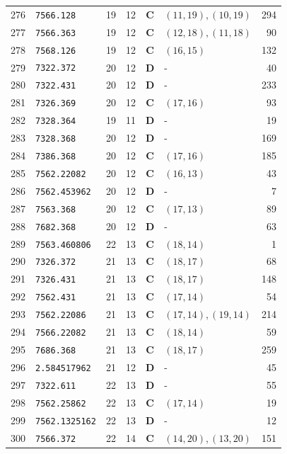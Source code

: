 \documentclass[11pt,a4paper]{article}
\begin{document}
\begin{small}
\begin{longtable}{r l c c c l r}
276 & \texttt{7566.128} & 19 & 12 & \textbf{C} & $(11,19), (10,19)$ & 294 \\
277 & \texttt{7566.363} & 19 & 12 & \textbf{C} & $(12,18), (11,18)$ & 90 \\
278 & \texttt{7568.126} & 19 & 12 & \textbf{C} & $(16,15)$ & 132 \\
279 & \texttt{7322.372} & 20 & 12 & \textbf{D} & - & 40 \\
280 & \texttt{7322.431} & 20 & 12 & \textbf{D} & - & 233 \\
281 & \texttt{7326.369} & 20 & 12 & \textbf{C} & $(17,16)$ & 93 \\
282 & \texttt{7328.364} & 19 & 11 & \textbf{D} & - & 19 \\
283 & \texttt{7328.368} & 20 & 12 & \textbf{D} & - & 169 \\
284 & \texttt{7386.368} & 20 & 12 & \textbf{C} & $(17,16)$ & 185 \\
285 & \texttt{7562.22082} & 20 & 12 & \textbf{C} & $(16,13)$ & 43 \\
286 & \texttt{7562.453962} & 20 & 12 & \textbf{D} & - & 7 \\
287 & \texttt{7563.368} & 20 & 12 & \textbf{C} & $(17,13)$ & 89 \\
288 & \texttt{7682.368} & 20 & 12 & \textbf{D} & - & 63 \\
289 & \texttt{7563.460806} & 22 & 13 & \textbf{C} & $(18,14)$ & 1 \\
290 & \texttt{7326.372} & 21 & 13 & \textbf{C} & $(18,17)$ & 68 \\
291 & \texttt{7326.431} & 21 & 13 & \textbf{C} & $(18,17)$ & 148 \\
292 & \texttt{7562.431} & 21 & 13 & \textbf{C} & $(17,14)$ & 54 \\
293 & \texttt{7562.22086} & 21 & 13 & \textbf{C} & $(17,14), (19,14)$ & 214 \\
294 & \texttt{7566.22082} & 21 & 13 & \textbf{C} & $(18,14)$ & 59 \\
295 & \texttt{7686.368} & 21 & 13 & \textbf{C} & $(18,17)$ & 259 \\
296 & \texttt{2.584517962} & 21 & 12 & \textbf{D} & - & 45 \\
297 & \texttt{7322.611} & 22 & 13 & \textbf{D} & - & 55 \\
298 & \texttt{7562.25862} & 22 & 13 & \textbf{C} & $(17,14)$ & 19 \\
299 & \texttt{7562.1325162} & 22 & 13 & \textbf{D} & - & 12 \\
300 & \texttt{7566.372} & 22 & 14 & \textbf{C} & $(14,20), (13,20)$ & 151 \\

\end{longtable}
\end{small}
\end{document}
